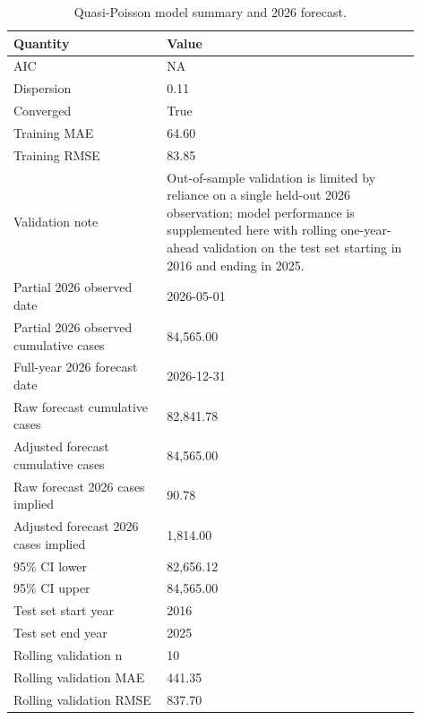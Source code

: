 \begin{table}[H]
\centering
\caption{Quasi-Poisson model summary and 2026 forecast.}
\label{tab:quasi_poisson_summary}
\small
\begin{tabular}{p{0.34\linewidth}p{0.56\linewidth}}
\toprule
Quantity & Value \\
\midrule
AIC & NA \\
Dispersion & 0.11 \\
Converged & True \\
Training MAE & 64.60 \\
Training RMSE & 83.85 \\
Validation note & Out-of-sample validation is limited by reliance on a single held-out 2026 observation; model performance is supplemented here with rolling one-year-ahead validation on the test set starting in 2016 and ending in 2025. \\
Partial 2026 observed date & 2026-05-01 \\
Partial 2026 observed cumulative cases & 84,565.00 \\
Full-year 2026 forecast date & 2026-12-31 \\
Raw forecast cumulative cases & 82,841.78 \\
Adjusted forecast cumulative cases & 84,565.00 \\
Raw forecast 2026 cases implied & 90.78 \\
Adjusted forecast 2026 cases implied & 1,814.00 \\
95\% CI lower & 82,656.12 \\
95\% CI upper & 84,565.00 \\
Test set start year & 2016 \\
Test set end year & 2025 \\
Rolling validation n & 10 \\
Rolling validation MAE & 441.35 \\
Rolling validation RMSE & 837.70 \\
\bottomrule
\end{tabular}
\end{table}
